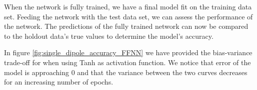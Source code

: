 \documentclass[a4paper, UKenglish, 11pt]{uiomaster}
\begin{document}
When the network is fully trained, we have a final model fit on the training data set. Feeding the network with the test data set, we can assess the performance of the network. The predictions of the fully trained network can now be compared to the holdout data's true values to determine the model's accuracy.

In figure \ref{fig:single_dipole_accuracy_FFNN} we have provided the bias-variance trade-off for when using Tanh as activation function. We notice that error of the model is approaching 0 and that the variance between the two curves decreases for an increasing number of epochs.


\end{document}
